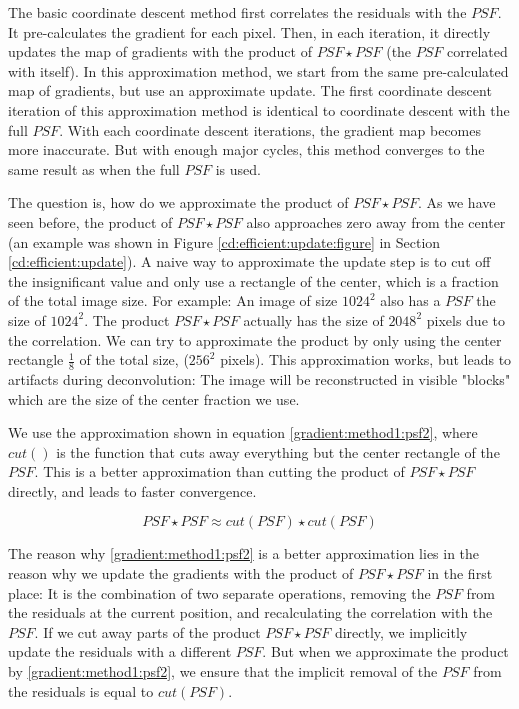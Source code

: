 The basic coordinate descent method first correlates the residuals with the $PSF$. It pre-calculates the gradient for each pixel. Then, in each iteration, it directly updates the map of gradients with the product of $PSF \star PSF$ (the $PSF$ correlated with itself). In this approximation method, we start from the same pre-calculated map of gradients, but use an approximate update. The first coordinate descent iteration of this approximation method is identical to coordinate descent with the full $PSF$. With each coordinate descent iterations, the gradient map becomes more inaccurate. But with enough major cycles, this method converges to the same result as when the full $PSF$ is used.

The question is, how do we approximate the product of $PSF \star PSF$. As we have seen before, the product of $PSF \star PSF$ also approaches zero away from the center (an example was shown in Figure \ref{cd:efficient:update:figure} in Section \ref{cd:efficient:update}). A naive way to approximate the update step is to cut off the insignificant value and only use a rectangle of the center, which is a fraction of the total image size. For example: An image of size $1024^2$ also has a $PSF$ the size of $1024^2$. The product $PSF \star PSF$ actually has the size of $2048^2$ pixels due to the correlation. We can try to approximate the product by only using the center rectangle $\frac{1}{8}$ of the total size, ($256^2$ pixels). This approximation works, but leads to artifacts during deconvolution: The image will be reconstructed in visible "blocks" which are the size of the center fraction we use. 

We use the approximation shown in equation \eqref{gradient:method1:psf2}, where $cut()$ is the function that cuts away everything but the center rectangle of the $PSF$. This is a better approximation than cutting the product of $PSF \star PSF$ directly, and leads to faster convergence.

\begin{equation}\label{gradient:method1:psf2}
PSF \star PSF \approx cut(PSF) \star cut(PSF)
\end{equation}

The reason why \eqref{gradient:method1:psf2} is a better approximation lies in the reason why we update the gradients with the product of $PSF \star PSF$ in the first place: It is the combination of two separate operations, removing the $PSF$ from the residuals at the current position, and recalculating the correlation with the $PSF$. If we cut away parts of the product $PSF \star PSF$ directly, we implicitly update the residuals with a different $PSF$. But when we approximate the product by \eqref{gradient:method1:psf2}, we ensure that the implicit removal of the $PSF$ from the residuals is equal to $cut(PSF)$.

